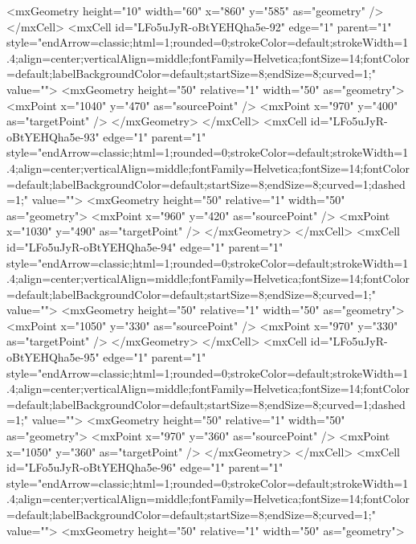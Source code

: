           <mxGeometry height="10" width="60" x="860" y="585" as="geometry" />
        </mxCell>
        <mxCell id="LFo5uJyR-oBtYEHQha5e-92" edge="1" parent="1" style="endArrow=classic;html=1;rounded=0;strokeColor=default;strokeWidth=1.4;align=center;verticalAlign=middle;fontFamily=Helvetica;fontSize=14;fontColor=default;labelBackgroundColor=default;startSize=8;endSize=8;curved=1;" value="">
          <mxGeometry height="50" relative="1" width="50" as="geometry">
            <mxPoint x="1040" y="470" as="sourcePoint" />
            <mxPoint x="970" y="400" as="targetPoint" />
          </mxGeometry>
        </mxCell>
        <mxCell id="LFo5uJyR-oBtYEHQha5e-93" edge="1" parent="1" style="endArrow=classic;html=1;rounded=0;strokeColor=default;strokeWidth=1.4;align=center;verticalAlign=middle;fontFamily=Helvetica;fontSize=14;fontColor=default;labelBackgroundColor=default;startSize=8;endSize=8;curved=1;dashed=1;" value="">
          <mxGeometry height="50" relative="1" width="50" as="geometry">
            <mxPoint x="960" y="420" as="sourcePoint" />
            <mxPoint x="1030" y="490" as="targetPoint" />
          </mxGeometry>
        </mxCell>
        <mxCell id="LFo5uJyR-oBtYEHQha5e-94" edge="1" parent="1" style="endArrow=classic;html=1;rounded=0;strokeColor=default;strokeWidth=1.4;align=center;verticalAlign=middle;fontFamily=Helvetica;fontSize=14;fontColor=default;labelBackgroundColor=default;startSize=8;endSize=8;curved=1;" value="">
          <mxGeometry height="50" relative="1" width="50" as="geometry">
            <mxPoint x="1050" y="330" as="sourcePoint" />
            <mxPoint x="970" y="330" as="targetPoint" />
          </mxGeometry>
        </mxCell>
        <mxCell id="LFo5uJyR-oBtYEHQha5e-95" edge="1" parent="1" style="endArrow=classic;html=1;rounded=0;strokeColor=default;strokeWidth=1.4;align=center;verticalAlign=middle;fontFamily=Helvetica;fontSize=14;fontColor=default;labelBackgroundColor=default;startSize=8;endSize=8;curved=1;dashed=1;" value="">
          <mxGeometry height="50" relative="1" width="50" as="geometry">
            <mxPoint x="970" y="360" as="sourcePoint" />
            <mxPoint x="1050" y="360" as="targetPoint" />
          </mxGeometry>
        </mxCell>
        <mxCell id="LFo5uJyR-oBtYEHQha5e-96" edge="1" parent="1" style="endArrow=classic;html=1;rounded=0;strokeColor=default;strokeWidth=1.4;align=center;verticalAlign=middle;fontFamily=Helvetica;fontSize=14;fontColor=default;labelBackgroundColor=default;startSize=8;endSize=8;curved=1;" value="">
          <mxGeometry height="50" relative="1" width="50" as="geometry">

